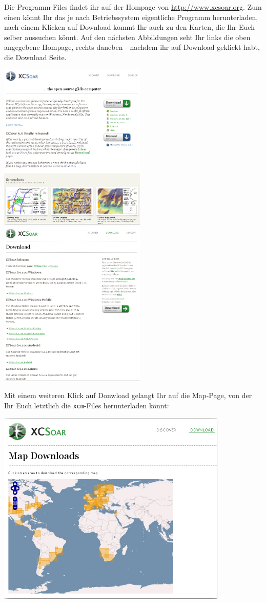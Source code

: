 Die Programm-Files findet ihr auf der Hompage von \xc \url{http://www.xcsoar.org}. Zum einen könnt Ihr das je nach Betriebssystem eigentliche Programm herunterladen, nach einem Klicken auf Download kommt Ihr auch zu den Karten, die Ihr Euch selber aussuchen könnt.
Auf den nächsten Abbildungen seht Ihr links die oben angegebene Hompage, rechts daneben - nachdem ihr auf Download geklickt habt, die Download Seite.
%
\begin{center}
\includegraphics[width=7cm]{Bilder/XC-HP-HP.png}
\quad
\includegraphics[width=7cm]{Bilder/XC-HP-Download.png}
\end{center}
%
Mit einem weiteren Klick auf Donwload gelangt Ihr auf die \textsf{Map}-Page, von der Ihr Euch letztlich die \texttt{xcm}-Files herunterladen könnt:
%
\begin{center}
\includegraphics[width=11cm]{Bilder/XC-HP-MapDownload.png}
\end{center}
%

